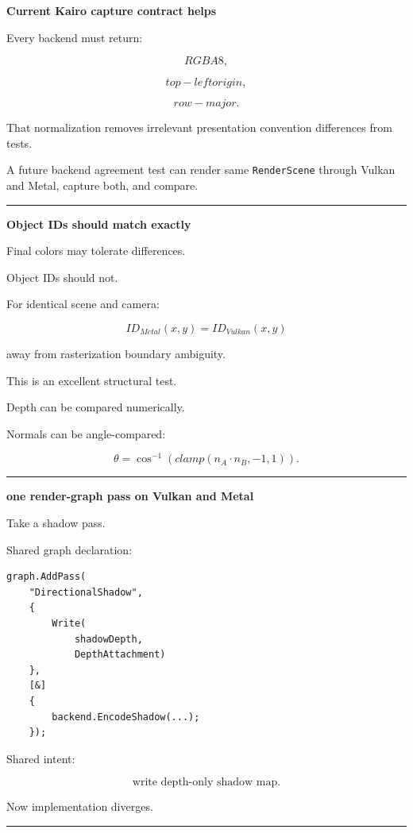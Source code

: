 \textbf{Current Kairo capture contract helps}

Every backend must return:

\[
RGBA8,
\]

\[
top-left origin,
\]

\[
row-major.
\]

That normalization removes irrelevant presentation convention differences from tests.

A future backend agreement test can render same \texttt{RenderScene} through Vulkan and Metal, capture both, and compare.

\begin{center}\rule{0.5\linewidth}{0.5pt}\end{center}

\textbf{Object IDs should match exactly}

Final colors may tolerate differences.

Object IDs should not.

For identical scene and camera:

\[
ID_{Metal}(x,y)
=
ID_{Vulkan}(x,y)
\]

away from rasterization boundary ambiguity.

This is an excellent structural test.

Depth can be compared numerically.

Normals can be angle-compared:

\[
\theta=
\cos^{-1}
(
clamp(
n_A\cdot n_B,
-1,1
)).
\]

\begin{center}\rule{0.5\linewidth}{0.5pt}\end{center}

\textbf{one render-graph pass on Vulkan and Metal}

Take a shadow pass.

Shared graph declaration:

\begin{verbatim}
graph.AddPass(
    "DirectionalShadow",
    {
        Write(
            shadowDepth,
            DepthAttachment)
    },
    [&]
    {
        backend.EncodeShadow(...);
    });
\end{verbatim}

Shared intent:

\[
\boxed{
\text{write depth-only shadow map}.
}
\]

Now implementation diverges.

\begin{center}\rule{0.5\linewidth}{0.5pt}\end{center}

